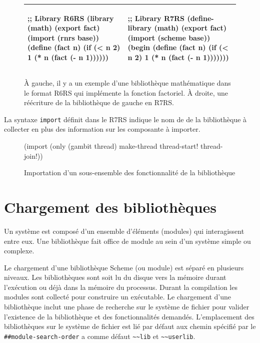 \begin{center}
  \begin{figure}[h]
  \begin{tabular}{|l|l|}
    \hline
    \begin{mplisting}{0.5}
;; Library R6RS
(library (math)
  (export fact)
  (import (rnrs base))
  (define (fact n)
    (if (< n 2)
      1
      (* n (fact (- n 1))))))
\end{mplisting} &
    \begin{mplisting}{0.5}
;; Library R7RS
(define-library (math)
  (export fact)
  (import (scheme base))
  (begin
    (define (fact n)
      (if (< n 2)
        1
        (* n (fact (- n 1)))))))
\end{mplisting}\\\hline
  \end{tabular}
\caption{À gauche, il y a un exemple d'une bibliothèque mathématique dans le format R6RS qui implémente
la fonction factoriel. À droite, une réécriture de la bibliothèque de gauche en R7RS.}
  \label{fig:r6rs_r7rs_math_mdoule}
\end{figure}
\end{center}

La syntaxe \lstinline{import} définit dans le R7RS indique le nom de
de la bibliothèque à collecter en plus des information sur les composante
à importer.
\begin{figure}[ht]
  \begin{mplisting}{0.9}
(import (only (gambit thread) make-thread thread-start! thread-join!))
\end{mplisting}
  \caption{Importation d'un sous-ensemble des fonctionnalité de la bibliothèque}
\end{figure}


\section{Chargement des bibliothèques}


Un système est composé d'un ensemble d'éléments (modules) qui interagissent
entre eux.  Une bibliothèque fait office de module au sein d'un système simple
ou complexe.

Le chargement d'une bibliothèque Scheme (ou module) est séparé en plusieurs niveaux.
Les bibliothèques sont soit lu du disque vers la mémoire durant l'exécution
ou déjà dans la mémoire du processus. Durant la compilation les modules sont
collecté pour construire un exécutable. Le chargement
d'une bibliothèque inclut une phase de recherche sur le système de fichier pour valider
l'existence de la bibliothèque et des fonctionnalités demandés. L'emplacement des
bibliothèques sur le système de fichier est lié par défaut aux chemin spécifié par
le \lstinline{##module-search-order} a comme défaut \lstinline{~~lib} et \lstinline{~~userlib}.


